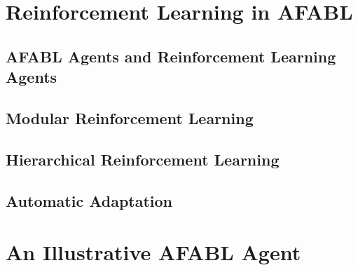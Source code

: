 \section{Reinforcement Learning in AFABL}

\subsection{AFABL Agents and Reinforcement Learning Agents}

\subsection{Modular Reinforcement Learning}

\subsection{Hierarchical Reinforcement Learning}

\subsection{Automatic Adaptation}

\section{An Illustrative AFABL Agent}